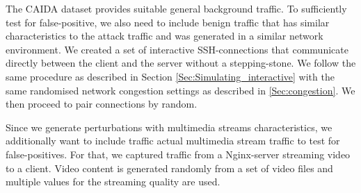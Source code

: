 \documentclass[runningheads,11pt]{llncs}\usepackage[]{graphicx}\usepackage[]{color}
\begin{document}
The CAIDA dataset provides suitable general background traffic. To sufficiently test for false-positive, we also need to include benign traffic that has similar characteristics to the attack traffic and was generated in a similar network environment. We created a set of interactive SSH-connections that communicate directly between the client and the server without a stepping-stone. We follow the same procedure as described in Section \ref{Sec:Simulating_interactive} with the same randomised network congestion settings as described in \ref{Sec:congestion}. We then proceed to pair connections by random.

Since we generate perturbations with multimedia streams characteristics, we additionally want to include traffic actual multimedia stream traffic to test for false-positives. For that, we captured traffic from a Nginx-server streaming video to a client. Video content is generated randomly from a set of video files and multiple values for the streaming quality are used.



\end{document}
